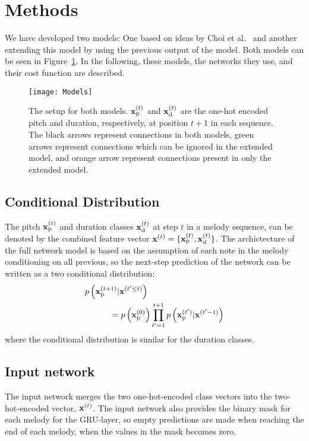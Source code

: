 \section{Methods}
\label{sec:method}

We have developed two models:
One based on ideas by Choi et al.\ \cite{Choi2015} and another extending this model by using the previous output of the model.
Both models can be seen in Figure~\ref{fig:methods:models}.
In the following, these models, the networks they use, and their cost function are described.

\begin{figure*}
	\centering
	\texttt{[image: Models]}
	\caption{The setup for both models. $\bm{\mathrm{x}}^{(t)}_{\text{p}}$ and $\bm{\mathrm{x}}^{(t)}_{\text{d}}$ are the one-hot encoded pitch and duration, respectively, at position $t + 1$ in each sequence. The black arrows represent connections in both models, green arrows represent connections which can be ignored in the extended model, and orange arrow represent connections present in only the extended model.}
	\label{fig:methods:models}
\end{figure*}

\subsection{Conditional Distribution} %
\label{sub:conditional_distribution}
	The pitch $\bm{\mathrm{x}}^{(t)}_{\text{p}}$ and duration classes $\bm{\mathrm{x}}^{(t)}_{\text{d}}$ at step $t$ in a melody sequence, can be denoted by the combined feature vector $\bm{\mathrm{x}}^{(t)}=\{\bm{\mathrm{x}}^{(t)}_{\text{p}},\bm{\mathrm{x}}^{(t)}_{\text{d}}\}$.	
	The archictecture of the full network model is based on the assumption of each note in the melody conditioning on all previous, so the next-step prediction of the network can be written as a two conditional distribution:
	\begin{gather}
		\begin{split}
		\MoveEqLeft[3]
				p\left(\vec{x}\order{t+1}\idx{p}|\vec{x}\order{t'\le t}\right) \\ 
				& = p\left(\vec{x}\order{0}\idx{p}\right) \prod^{t+1}_{t'=1} p\left(\vec{x}\order{t'}\idx{p}|\vec{x}\order{t'-1}\right) \label{}
		\end{split} 	
	\end{gather}
	where the conditional distribution is similar for the duration classes.

\subsection{Input network} %
\label{sub:input_network}
The input network merges the two one-hot-encoded class vectors into the two-hot-encoded vector, $\bm{\mathrm{x}}^{(t)}$. The input network also provides the binary mask for each melody for the GRU-layer, so empty predictions are made when reaching the end of each melody, when the values in the mask becomes zero.

